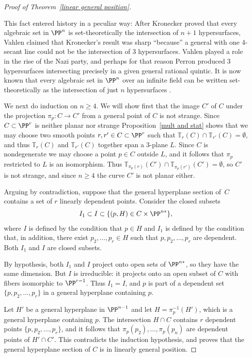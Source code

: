 \begin{proof}[Proof of Theorem~\ref{linear general position}]
\begin{fact}
 This fact entered history in a peculiar way:
 After Kronecker \citeyear{Kronecker} proved that every algebraic set in
  $\PP^{n}$ is set-theoretically the intersection of $n+1$
%
%
%
%
  hypersurfaces, 
Vahlen \citeyear{Vahlen} claimed that Kronecker's result was
  sharp ``because'' a general 
%
with one 4-secant line
  could not be the intersection of 3 hypersurfaces.
  Vahlen played a role in the rise of the Nazi party, and perhaps for
  that reason 
Perron \citeyear{Perron} produced 3 hypersurfaces intersecting
%
  precisely in a given general rational quintic. It is now known that
  every algebraic set in
  $\PP^{n}$ over an infinite field can be written set-theoretically as
  the intersection of just $n$ hypersurfaces \cite{Eisenbud-Evans}.
\end{fact}

We next do induction on $n\geq 4$. We will show first that the image
$C'$ of
$C$ under the projection $\pi_p: C\to C'$ from a general point of $C$
is not strange. Since $C\subset \PP^r$ is neither
planar nor strange
Proposition~\ref{mult and stat} shows that we may choose two smooth points
$r,r'\in C\subset \PP^r$ such that ${\mathbb T}_r(C)\cap {\mathbb T}_{r'}(C) = \emptyset$,
and thus
${\mathbb T}_r(C)$ and ${\mathbb T}_{r'}(C)$ together span a 3-plane $L$. Since $C$ is
nondegenerate we may
choose a point $p\in C$ outside $L$, and it follows that $\pi_p$
restricted to $L$ is an isomorphism.
Thus ${\mathbb T}_{\pi_p(r)}(C') \cap {\mathbb T}_{\pi_p({r'})}(C') = \emptyset$, so $C'$
is not strange,
and since $n\geq 4$ the curve $C'$ is not planar either.

Arguing by contradiction, suppose that the general hyperplane section
of~$C$ contains a set of $r$ linearly dependent points. Consider the
closed subsets
$$
I_1 \subset I \subset \{(p,H) \in C \times \PP^{n*}\}
,
$$
where $I$ is defined by the 
condition
that $p\in H$ and $I_1$ is defined
by the condition that, in addition, there exist $p_2,\dots, p_r\in H$
such that $p, p_2, \dots, p_r$ are dependent. Both $I_1$ and $I$ are
closed subsets.

By hypothesis, both $I_1$ and $I$ project onto open sets of $\PP^{n*}$,
so they have the same dimension.
But $I$ is irreducible: it projects onto an open subset of $C$ with
fibers isomorphic to $\PP^{r-1}$. Thus $I_1 = I$,
and  $p$ is part of a dependent set
$\{p, p_2,\dots, p_r\}$ in a general hyperplane containing $p$.

Let $H'$ be a general hyperplane in $\PP^{n-1}$
and let $H = \pi_p^{-1}(H')$, which is a general hyperplane containing
$p$. The intersection $H\cap C$
contains $r$ dependent points $\{p, p_2,\dots, p_r\}$, and it follows
that $\pi_p(p_2),\dots,\pi_p(p_n)$
are dependent points of $H'\cap C'$. This contradicts the induction
hypothesis, and proves that
the general hyperplane section of $C$ is in linearly general position.
\end{proof}

